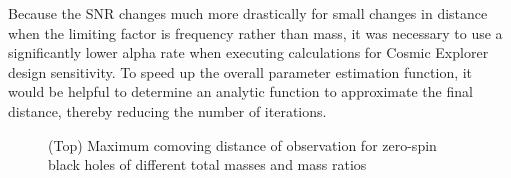 \documentclass{article}
\begin{document}
Because the SNR changes much more drastically for small changes in distance when the limiting factor is frequency rather than mass, it was necessary to use a significantly lower alpha rate when executing calculations for Cosmic Explorer design sensitivity. To speed up the overall parameter estimation function, it would be helpful to determine an analytic function to approximate the final distance, thereby reducing the number of iterations. \\

\begin{figure}[!htb]
    \caption{\label{fig:dist} (Top) Maximum comoving distance of observation for zero-spin black holes of different total masses and mass ratios}
\end{figure}
\end{document}
